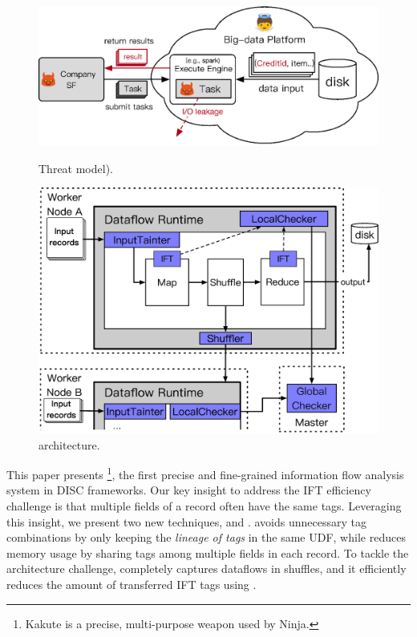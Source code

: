 \begin{figure}[h]
    \centering
    \begin{minipage}{.48\textwidth}    
        \vspace{-.15in}
        \includegraphics[width=0.31\textheight]{figures/threat_private.ps}
        \vspace{-.3in}         
        \caption{Threat model).}
        \label{fig:falcon-arch}
    \end{minipage}
    \centering
    \begin{minipage}{0.48\textwidth}
        \vspace{-.17in}
        \includegraphics[width=0.34\textheight]{figures/kakute_arch.ps}
        \vspace{-.32in}
        \caption{\kakute architecture.}
        \label{fig:falcon-protocol}
    \end{minipage}
\end{figure}

This paper presents \kakute\footnote{Kakute is a precise, multi-purpose weapon 
used by
Ninja.}, the first precise and fine-grained information flow
analysis system in DISC frameworks.
Our key insight to address the IFT efficiency challenge is that multiple fields 
of a record
often have the same tags.
Leveraging this insight, we present two new techniques, \lazyp and \tagcache.
\lazyp avoids unnecessary tag combinations by only keeping the \textit{lineage 
of tags} in
the same UDF, while \tagcache reduces memory usage by sharing
tags among multiple fields in each record.
To tackle the architecture challenge,
\kakute completely captures dataflows in shuffles, and it efficiently
reduces the amount of transferred IFT tags using \tagcache.

